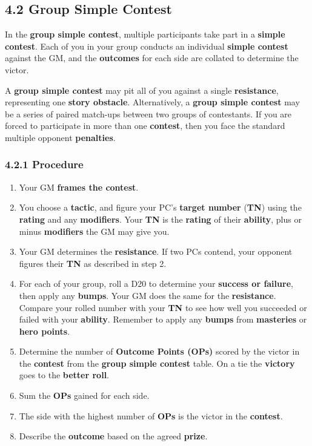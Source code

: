 \documentclass[
]{article}
\providecommand{\tightlist}{%
  \setlength{\itemsep}{0pt}\setlength{\parskip}{0pt}}
\begin{document}
\hypertarget{group-simple-contest}{%
\subsection{4.2 Group Simple Contest}\label{group-simple-contest}}

In the \textbf{group simple contest}, multiple participants take part in
a \textbf{simple contest}. Each of you in your group conducts an
individual \textbf{simple contest} against the GM, and the
\textbf{outcomes} for each side are collated to determine the victor.

A \textbf{group simple contest} may pit all of you against a single
\textbf{resistance}, representing one \textbf{story obstacle}.
Alternatively, a \textbf{group simple contest} may be a series of paired
match-ups between two groups of contestants. If you are forced to
participate in more than one \textbf{contest}, then you face the
standard multiple opponent \textbf{penalties}.

\hypertarget{procedure-1}{%
\subsubsection{4.2.1 Procedure}\label{procedure-1}}

\begin{enumerate}
\def\labelenumi{\arabic{enumi}.}
\tightlist
\item
  Your GM \textbf{frames the contest}.
\item
  You choose a \textbf{tactic}, and figure your PC's \textbf{target
  number} (\textbf{TN}) using the \textbf{rating} and any
  \textbf{modifiers}. Your \textbf{TN} is the \textbf{rating} of their
  \textbf{ability}, plus or minus \textbf{modifiers} the GM may give
  you.
\item
  Your GM determines the \textbf{resistance}. If two PCs contend, your
  opponent figures their \textbf{TN} as described in step 2.
\item
  For each of your group, roll a D20 to determine your \textbf{success
  or failure}, then apply any \textbf{bumps}. Your GM does the same for
  the \textbf{resistance}. Compare your rolled number with your
  \textbf{TN} to see how well you succeeded or failed with your
  \textbf{ability}. Remember to apply any \textbf{bumps} from
  \textbf{masteries} or \textbf{hero points}.
\item
  Determine the number of \textbf{Outcome Points (OPs)} scored by the
  victor in the \textbf{contest} from the \textbf{group simple contest}
  table. On a tie the \textbf{victory} goes to the \textbf{better roll}.
\item
  Sum the \textbf{OPs} gained for each side.
\item
  The side with the highest number of \textbf{OPs} is the victor in the
  \textbf{contest}.
\item
  Describe the \textbf{outcome} based on the agreed \textbf{prize}.
\end{enumerate}
\end{document}
